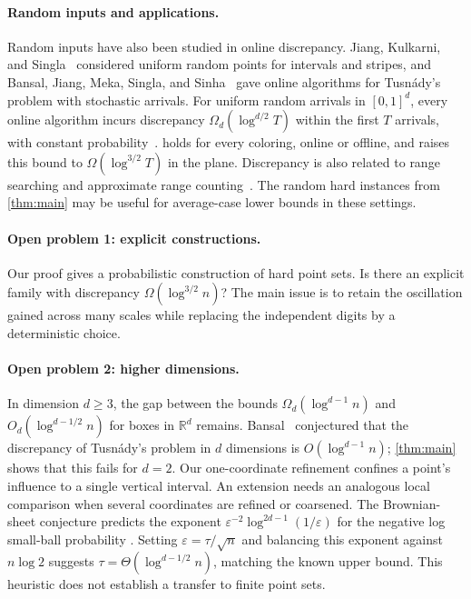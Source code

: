 \documentclass[11pt,letterpaper]{article}
\newcommand{\R}{\mathbb{R}}
\newcommand{\1}{\mathbf{1}}
\newcommand{\eps}{\varepsilon}
\begin{document}
\paragraph{Random inputs and applications.}
Random inputs have also been studied in online discrepancy. Jiang, Kulkarni, and Singla~\cite{JKS19} considered uniform random points for intervals and stripes, and Bansal, Jiang, Meka, Singla, and Sinha~\cite{BJMSS21} gave online algorithms for Tusn\'ady's problem with stochastic arrivals. For uniform random arrivals in $[0,1]^d$, every online algorithm incurs discrepancy $\Omega_d(\log^{d/2}T)$ within the first $T$ arrivals, with constant probability~\cite{BJSS20}.  holds for every coloring, online or offline, and raises this bound to $\Omega(\log^{3/2}T)$ in the plane. Discrepancy is also related to range searching and approximate range counting~\cite{Lar14,WY13}. The random hard instances from \cref{thm:main} may be useful for average-case lower bounds in these settings.

\paragraph{Open problem 1: explicit constructions.}
Our proof gives a probabilistic construction of hard point sets. Is there an explicit family with discrepancy $\Omega(\log^{3/2}n)$? The main issue is to retain the oscillation gained across many scales while replacing the independent digits by a deterministic choice.

\paragraph{Open problem 2: higher dimensions.}
In dimension $d\ge3$, the gap between the bounds $\Omega_d(\log^{d-1}n)$ \cite{MN15} and $O_d(\log^{d-1/2}n)$ \cite{Nik17} for boxes in $\R^d$ remains. Bansal~\cite[Conjecture~1.4.1]{Ban22} conjectured that the discrepancy of Tusn\'ady's problem in $d$ dimensions is $O(\log^{d-1}n)$; \cref{thm:main} shows that this fails for $d=2$. Our one-coordinate refinement confines a point's influence to a single vertical interval. An extension needs an analogous local comparison when several coordinates are refined or coarsened. The Brownian-sheet conjecture predicts the exponent $\eps^{-2}\log^{2d-1}(1/\eps)$ for the negative log small-ball probability \cite[\mbox{Conjecture~4}]{BL13}. Setting $\eps=\tau/\sqrt n$ and balancing this exponent against $n\log2$ suggests $\tau=\Theta(\log^{d-1/2}n)$, matching the known upper bound. This heuristic does not establish a transfer to finite point sets.
\end{document}
